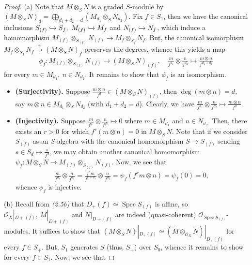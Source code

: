 \documentclass[11pt,a4paper,footinclude=true,headinclude=true]{scrbook} %
\DeclareMathOperator{\Spec}{Spec}
\newcommand{\OO}{\mathcal{O}}
\newcommand{\<}{\langle}
\newcommand{\>}{\rangle}
\begin{document}
\begin{proof}
    (a) Note that $M\otimes_SN$ is a graded $S$-module by $(M\otimes_SN)_d=\bigoplus_{d_1+d_2=d}(M_{d_1}\otimes_SN_{d_2})$. Fix $f\in S_1$, then we have the canonical inclusions $S_{(f)}\xhookrightarrow{}S_f,\ M_{(f)}\xhookrightarrow{}M_f$ and $N_{(f)}\xhookrightarrow{}N_f$, which induce a homomorphism $M_{(f)}\otimes_{S_{(f)}}N_{(f)}\to M_f\otimes_{S_f}N_f$. But, the canonical isomorphism $M_f\otimes_{S_f}N_f\xrightarrow{\sim}(M\otimes_SN)_f$ preserves the degrees, whence this yields a map
    \begin{align*}
        \phi_f:M_{(f)}\otimes_{S_{(f)}}N_{(f)}\longrightarrow(M\otimes_SN)_{(f)},\quad \frac{m}{f^{d_1}}\otimes\frac{n}{f^{d_2}}\longmapsto\frac{m\otimes n}{f^{d_1+d_2}}
    \end{align*}
    for every $m\in M_{d_1},\ n\in N_{d_2}$. It remains to show that $\phi_f$ is an isomorphism.
    \begin{itemize}
        \item \textbf{(Surjectivity).} Suppose $\frac{m\otimes n}{f^d}\in(M\otimes_SN)_{(f)}$, then $\deg(m\otimes n)=d$, say $m\otimes n\in M_{d_1}\otimes_SN_{d_2}$ (with $d_1+d_2=d$). Clearly, we have $\frac{m}{f^{d_1}}\otimes\frac{n}{f^{d_2}}\mapsto\frac{m\otimes n}{f^{d}}$. 
        \item \textbf{(Injectivity).} Suppose $\frac{m}{f^{d_1}}\otimes\frac{n}{f^{d_2}}\mapsto0$ where $m\in M_{d_1}$ and $n\in N_{d_2}$. Then, there exists an $r>0$ for which $f^r(m\otimes n)=0$ in $M\otimes_SN$. Note that if we consider $S_{(f)}$ as an $S$-algebra with the canonical homomorphism $S\to S_{(f)}$ sending $s\in S_d\mapsto\frac{s}{f^d}$, we may obtain another canonical homomorphism $\psi_f:M\otimes_SN\to M_{(f)}\otimes_{S_{(f)}}N_{(f)}$.
        Now, we see that
        \begin{align*}
            \frac{m}{f^{d_1}}\otimes\frac{n}{f^{d_2}}=\frac{f^rm}{f^{r+d_1}}\otimes\frac{n}{f^{d_2}}=\psi_f(f^rm\otimes n)=\psi_f(0)=0,
        \end{align*}
        whence $\phi_f$ is injective.
    \end{itemize}
    (b) Recall from \textit{(2.5b)} that $D_+(f)\simeq\Spec S_{(f)}$ is affine, so $\OO_X|_{D+(f)},\ \widetilde{M}|_{D+(f)}$ and $\widetilde{N}|_{D+(f)}$ are indeed (quasi-coherent) $\OO_{\Spec S_{(f)}}$-modules. It suffices to show that $(M\otimes_SN)\widetilde{}|_{D_+(f)}\simeq(\widetilde{M}\otimes_{\OO_X}\widetilde{N})|_{D_+(f)}$ for every $f\in S_+$. But, $S_1$ generates $S$ (thus, $S_+$) over $S_0$, whence it remains to show for every $f\in S_1$. Now, we see that

\end{proof}
\end{document}
